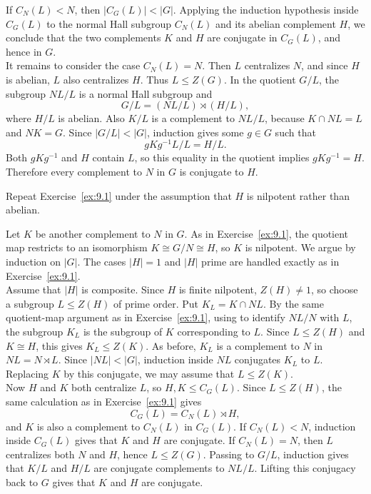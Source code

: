 \documentclass[../Odyssey_Project.tex]{subfiles}
\begin{document}
\begin{solution}
If $C_N(L)<N$, then $\lvert C_G(L)\rvert<\lvert G\rvert$. Applying the induction hypothesis inside $C_G(L)$ to the normal Hall subgroup $C_N(L)$ and its abelian complement $H$, we conclude that the two complements $K$ and $H$ are conjugate in $C_G(L)$, and hence in $G$.\\
It remains to consider the case $C_N(L)=N$. Then $L$ centralizes $N$, and since $H$ is abelian, $L$ also centralizes $H$. Thus $L\leq Z(G)$. In the quotient $G/L$, the subgroup $NL/L$ is a normal Hall subgroup and
\[
    G/L=(NL/L)\rtimes(H/L),
\]
where $H/L$ is abelian. Also $K/L$ is a complement to $NL/L$, because $K\cap NL=L$ and $NK=G$. Since $\lvert G/L\rvert<\lvert G\rvert$, induction gives some $g\in G$ such that
\[
    gKg^{-1}L/L=H/L.
\]
Both $gKg^{-1}$ and $H$ contain $L$, so this equality in the quotient implies $gKg^{-1}=H$. Therefore every complement to $N$ in $G$ is conjugate to $H$.
\end{solution}

\begin{exercise}
\label{ex:9.2}
Repeat Exercise~\ref{ex:9.1} under the assumption that $H$ is nilpotent rather than abelian.
\end{exercise}
\begin{solution}
Let $K$ be another complement to $N$ in $G$. As in Exercise~\ref{ex:9.1}, the quotient map restricts to an isomorphism $K\cong G/N\cong H$, so $K$ is nilpotent. We argue by induction on $\lvert G\rvert$. The cases $\lvert H\rvert=1$ and $\lvert H\rvert$ prime are handled exactly as in Exercise~\ref{ex:9.1}.\\
Assume that $\lvert H\rvert$ is composite. Since $H$ is finite nilpotent, $Z(H)\neq 1$, so choose a subgroup $L\leq Z(H)$ of prime order. Put $K_L=K\cap NL$. By the same quotient-map argument as in Exercise~\ref{ex:9.1}, using  to identify $NL/N$ with $L$, the subgroup $K_L$ is the subgroup of $K$ corresponding to $L$. Since $L\leq Z(H)$ and $K\cong H$, this gives $K_L\leq Z(K)$. As before, $K_L$ is a complement to $N$ in $NL=N\rtimes L$. Since $\lvert NL\rvert<\lvert G\rvert$, induction inside $NL$ conjugates $K_L$ to $L$. Replacing $K$ by this conjugate, we may assume that $L\leq Z(K)$.\\
Now $H$ and $K$ both centralize $L$, so $H,K\leq C_G(L)$. Since $L\leq Z(H)$, the same calculation as in Exercise~\ref{ex:9.1} gives
\[
    C_G(L)=C_N(L)\rtimes H,
\]
and $K$ is also a complement to $C_N(L)$ in $C_G(L)$. If $C_N(L)<N$, induction inside $C_G(L)$ gives that $K$ and $H$ are conjugate. If $C_N(L)=N$, then $L$ centralizes both $N$ and $H$, hence $L\leq Z(G)$. Passing to $G/L$, induction gives that $K/L$ and $H/L$ are conjugate complements to $NL/L$. Lifting this conjugacy back to $G$ gives that $K$ and $H$ are conjugate.
\end{solution}
\end{document}
